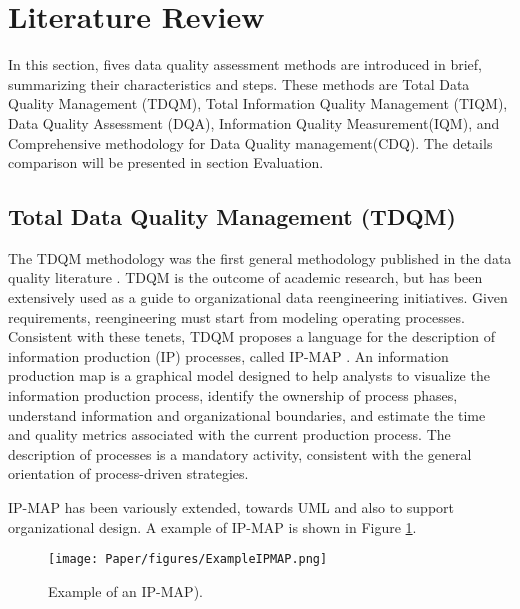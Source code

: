 \documentclass[pdftex,english,oribibl]{llncs}
\begin{document}
\section{Literature Review}
In this section, fives data quality assessment methods are introduced in brief, summarizing their characteristics and steps. These methods are Total Data Quality Management (TDQM), Total Information Quality Management (TIQM), Data Quality Assessment (DQA), Information Quality Measurement(IQM), and Comprehensive methodology for Data Quality management(CDQ). The details comparison will be presented in section Evaluation.

\subsection{Total Data Quality Management (TDQM)}\label{sec:TDQM}

The TDQM methodology was the first general methodology published in the data quality literature \cite{Wang1998TDQM}. TDQM is the outcome of academic research, but has been extensively used as a guide to organizational data reengineering initiatives.
Given requirements, reengineering must start from modeling operating processes. Consistent with these tenets, TDQM proposes a language for the description of information production (IP) processes, called IP-MAP \cite{Shankaranarayanan2007IPMAPC}. An information production map is a graphical model designed to help analysts to visualize the information production process, identify the ownership of process phases, understand information and organizational boundaries, and estimate the time and quality metrics associated with the current production process.
The description of processes is a mandatory activity, consistent with the general orientation of process-driven strategies.
\begin{comment}
IP-MAP is the only language for information process modeling and represents a de facto standard. Practical experiences with TDQM are reported, for example, in Kovac and Weickert [2002].
\end{comment}
IP-MAP has been variously extended, towards UML and also to support organizational design.  A example of IP-MAP is shown in Figure \ref{fig:ExampleIPMAP}.

\begin{figure}
    \centering
    \texttt{[image: Paper/figures/ExampleIPMAP.png]}
    \caption{Example of an IP-MAP).}
    \label{fig:ExampleIPMAP}
 \end{figure}
\end{document}
